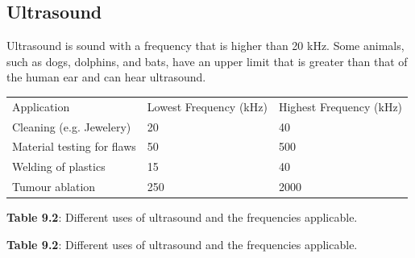             \subsection{ Ultrasound}
            \nopagebreak
      \label{m38800*id185135}Ultrasound is sound with a frequency that is higher than 20 kHz. Some animals, such as dogs, dolphins, and bats, have an upper limit that is greater than that of the human ear and can hear ultrasound.
          \begin{table}[H]
        \begin{center}
      \label{m38800*eip-558}
    \noindent
      \tablelasttail{}
      \begin{xtabular}[t]{|l|l|l|}\hline
        Application &
        Lowest Frequency (kHz) &
        Highest Frequency (kHz)%
     \tabularnewline{}
        Cleaning (e.g. Jewelery) &
        20 &
        40%
     \tabularnewline{}
        Material testing for flaws &
        50 &
        500%
     \tabularnewline{}
        Welding of plastics &
        15 &
        40%
     \tabularnewline{}
        Tumour ablation &
        250 &
        2000%
     \tabularnewline{}
    \end{xtabular}
      \end{center}
    \begin{center}{\small\bfseries Table 9.2}: Different uses of ultrasound and the frequencies applicable.\end{center}
    \begin{caption}{\small\bfseries Table 9.2}: Different uses of ultrasound and the frequencies applicable.\end{caption}
\end{table}
